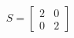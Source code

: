 \documentclass[preview]{standalone}
\begin{document}
\begin{align*}
S = \begin{bmatrix} 2 & 0 \\ 0 & 2 \end{bmatrix}
\end{align*}
\end{document}
